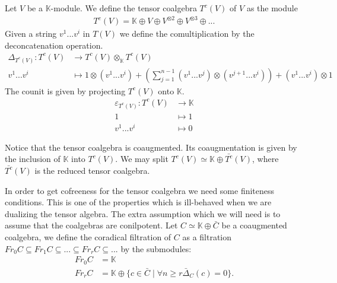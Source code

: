\documentclass[../../thesis.tex]{subfiles}
\begin{document}
            \begin{definition}
                Let $V$ be a $\mathbb{K}$-module. We define the tensor coalgebra $T^c(V)$ of $V$ as the module
                \begin{align*}
                    T^c(V) = \mathbb{K}\oplus V\oplus V^{\otimes 2}\oplus V^{\otimes 3}\oplus ...
                \end{align*}
                Given a string $v^1...v^i$ in $T(V)$ we define the comultiplication by the deconcatenation operation.
                \begin{align*}
                    \Delta_{T^c(V)}:T^c(V) & \rightarrow T^c(V)\otimes_{\mathbb{K}}T^c(V) \\
                    v^1...v^i & \mapsto 1\otimes(v^1...v^i) + (\sum_{j=1}^{n-1} (v^1...v^{j})\otimes(v^{j+1}...v^i)) + (v^1...v^i)\otimes 1
                \end{align*}
                The counit is given by projecting $T^c(V)$ onto $\mathbb{K}$.
                \begin{align*}
                    \varepsilon_{T^c(V)} : T^c(V) & \rightarrow \mathbb{K} \\
                    1 & \mapsto 1 \\
                    v^1...v^i & \mapsto 0
                \end{align*}
            \end{definition}

            Notice that the tensor coalgebra is coaugmented. Its coaugmentation is given by the inclusion of $\mathbb{K}$ into $T^c(V)$. We may split $T^c(V) \simeq \mathbb{K}\oplus \bar{T^c}(V)$, where $\bar{T^c}(V)$ is the reduced tensor coalgebra.

            In order to get cofreeness for the tensor coalgebra we need some finiteness conditions. This is one of the properties which is ill-behaved when we are dualizing the tensor algebra. The extra assumption which we will need is to assume that the coalgebras are conilpotent. Let $C \simeq \mathbb{K} \oplus \bar{C}$ be a coaugmented coalgebra, we define the coradical filtration of $C$ as a filtration $Fr_0C \subseteq Fr_1C \subseteq ... \subseteq Fr_rC \subseteq ...$ by the submodules:
            \begin{align*}
                Fr_0C & = \mathbb{K} \\
                Fr_rC & = \mathbb{K} \oplus \{c\in\bar{C}\mid \forall n\geq r \bar{\Delta}_C(c) = 0\}.
            \end{align*}
\end{document}
